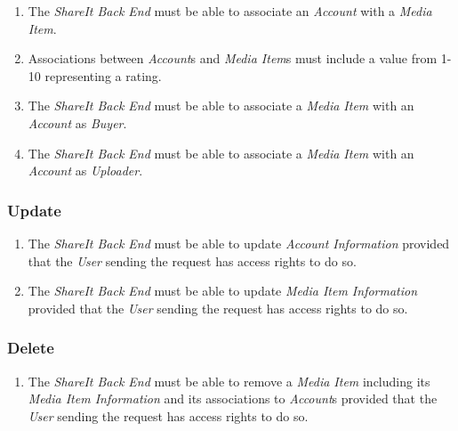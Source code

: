 \begin{enumerate}[label=\textbf{FR-\twodigits*},resume]
\item The \textit{ShareIt Back End} must be able to associate an \textit{Account} with a \textit{Media Item}.

\item Associations between \textit{Account}s and \textit{Media Item}s must include a value from 1-10 representing a rating.

\item The \textit{ShareIt Back End} must be able to associate a \textit{Media Item} with an \textit{Account} as \textit{Buyer}.

\item The \textit{ShareIt Back End} must be able to associate a \textit{Media Item} with an \textit{Account} as \textit{Uploader}.
\end{enumerate}

\subsubsection{Update}
\begin{enumerate}[label=\textbf{FR-\twodigits*},resume]

\item The \textit{ShareIt Back End} must be able to update \textit{Account Information} provided that the \textit{User} sending the request has access rights to do so.

\item The \textit{ShareIt Back End} must be able to update \textit{Media Item Information} provided that the \textit{User} sending the request has access rights to do so.
\end{enumerate}

\subsubsection{Delete}
\begin{enumerate}[label=\textbf{FR-\twodigits*},resume]

\item The \textit{ShareIt Back End} must be able to remove a \textit{Media Item} including its \textit{Media Item Information} and its associations to \textit{Account}s provided that the \textit{User} sending the request has access rights to do so.

\end{enumerate}

